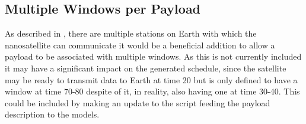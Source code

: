 \subsection*{Multiple Windows per Payload}\label{ssec:multi_window}
As described in , there are multiple stations on Earth with which the nanosatellite can communicate it would be a beneficial addition to allow a payload to be associated with multiple windows. As this is not currently included it may have a significant impact on the generated schedule, since the satellite may be ready to transmit data to Earth at time 20 but is only defined to have a window at time 70-80 despite of it, in reality, also having one at time 30-40. This could be included by making an update to the script feeding the payload description to the models.


